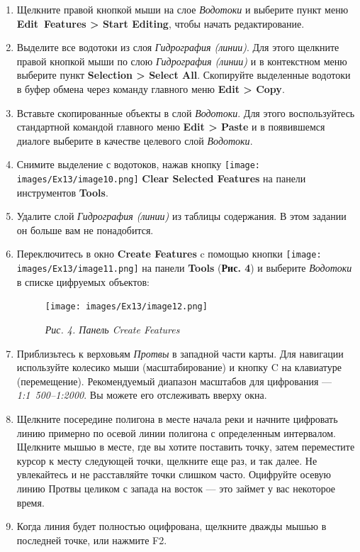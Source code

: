 \documentclass[12pt,]{book}
\begin{document}
\begin{enumerate}
\def\labelenumi{\arabic{enumi}.}
\item
  Щелкните правой кнопкой мыши на слое \emph{Водотоки} и выберите пункт меню \textbf{Edit~Features \textgreater{} Start Editing}, чтобы начать редактирование.
\item
  Выделите все водотоки из слоя \emph{Гидрография (линии)}. Для этого щелкните правой кнопкой мыши по слою \emph{Гидрография (линии)} и в контекстном меню выберите пункт \textbf{Selection \textgreater{} Select All}. Скопируйте выделенные водотоки в буфер обмена через команду главного меню \textbf{Edit \textgreater{} Copy}.
\item
  Вставьте скопированные объекты в слой \emph{Водотоки}. Для этого воспользуйтесь стандартной командой главного меню \textbf{Edit \textgreater{} Paste} и в появившемся диалоге выберите в качестве целевого слой \emph{Водотоки}.
\item
  Снимите выделение с водотоков, нажав кнопку \texttt{[image: images/Ex13/image10.png]} \textbf{Clear Selected Features} на панели инструментов \textbf{Tools}.
\item
  Удалите слой \emph{Гидрография (линии)} из таблицы содержания. В этом задании он больше вам не понадобится.
\item
  Переключитесь в окно \textbf{Create Features} c помощью кнопки \texttt{[image: images/Ex13/image11.png]} на панели \textbf{Tools} (\textbf{Рис. 4}) и выберите \emph{Водотоки} в списке цифруемых объектов:

  \begin{figure}
  \centering
  \texttt{[image: images/Ex13/image12.png]}
  \caption{\emph{Рис. 4. Панель Create Features}}
  \end{figure}
\item
  Приблизьтесь к верховьям \emph{Протвы} в западной части карты. Для навигации используйте колесико мыши (масштабирование) и кнопку C на клавиатуре (перемещение). Рекомендуемый диапазон масштабов для цифрования --- \emph{1:1~500--1:2000}. Вы можете его отслеживать вверху окна.
\item
  Щелкните посередине полигона в месте начала реки и начните цифровать линию примерно по осевой линии полигона с определенным интервалом. Щелкните мышью в месте, где вы хотите поставить точку, затем переместите курсор к месту следующей точки, щелкните еще раз, и так далее. Не увлекайтесь и не расставляйте точки слишком часто. Оцифруйте осевую линию Протвы целиком с запада на восток --- это займет у вас некоторое время.
\item
  Когда линия будет полностью оцифрована, щелкните дважды мышью в последней точке, или нажмите F2.


\end{enumerate}
\end{document}
